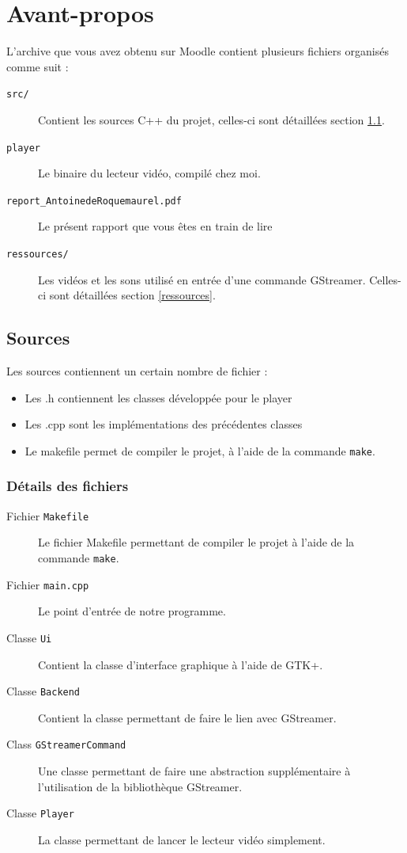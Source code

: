 \documentclass[a4paper, 11pt]{article}
\begin{document}
	\maketitle
	\section{Avant-propos}
	L'archive que vous avez obtenu sur Moodle contient plusieurs fichiers organisés comme suit : 
	\begin{description}
		\item[\texttt{src/}] Contient les sources C++ du projet, celles-ci sont détaillées section \ref{src}.
		\item[\texttt{player}] Le binaire du lecteur vidéo, compilé chez moi.
		\item[\texttt{report\_AntoinedeRoquemaurel.pdf}] Le présent rapport que vous êtes en train de lire
		\item[\texttt{ressources/}] Les vidéos et les sons utilisé en entrée d'une commande GStreamer. Celles-ci sont détaillées section \ref{ressources}.
	\end{description}
	\subsection{Sources}\label{src}
	Les sources contiennent un certain nombre de fichier :
	\begin{itemize}
		\item Les .h contiennent les classes développée pour le player
		\item Les .cpp sont les implémentations des précédentes classes
		\item Le makefile permet de compiler le projet, à l'aide de la commande \texttt{make}.
	\end{itemize}
	\subsubsection{Détails des fichiers}
	\begin{description}
		\item[Fichier \texttt{Makefile}] Le fichier Makefile permettant de compiler le projet à l'aide de la commande \texttt{make}.
		\item[Fichier \texttt{main.cpp}] Le point d'entrée de notre programme.
		\item[Classe \texttt{Ui}] Contient la classe d'interface graphique à l'aide de GTK+. 
		\item[Classe \texttt{Backend}] Contient la classe permettant de faire le lien avec GStreamer.
		\item[Class \texttt{GStreamerCommand}] Une classe permettant de faire une abstraction supplémentaire à l'utilisation de la bibliothèque
			GStreamer.
		\item[Classe \texttt{Player}] La classe permettant de lancer le lecteur vidéo simplement.
	\end{description}
\end{document}
